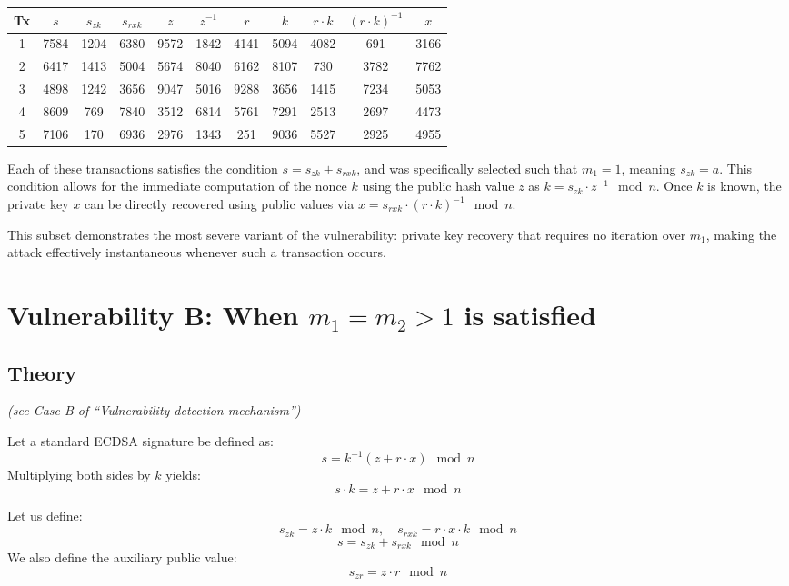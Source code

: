 \documentclass[11pt]{article}
\begin{document}
\begin{center}
\begin{tabular}{|c|c|c|c|c|c|c|c|c|c|c|}
\hline
Tx & $s$ & $s_{zk}$ & $s_{rxk}$ & $z$ & $z^{-1}$ & $r$ & $k$ & $r \cdot k$ & $(r \cdot k)^{-1}$ & $x$ \\
\hline
1 & 7584 & 1204 & 6380 & 9572 & 1842 & 4141 & 5094 & 4082 & 691 & 3166 \\
2 & 6417 & 1413 & 5004 & 5674 & 8040 & 6162 & 8107 & 730 & 3782 & 7762 \\
3 & 4898 & 1242 & 3656 & 9047 & 5016 & 9288 & 3656 & 1415 & 7234 & 5053 \\
4 & 8609 & 769 & 7840 & 3512 & 6814 & 5761 & 7291 & 2513 & 2697 & 4473 \\
5 & 7106 & 170 & 6936 & 2976 & 1343 & 251 & 9036 & 5527 & 2925 & 4955 \\
\hline
\end{tabular}
\end{center}

Each of these transactions satisfies the condition \( s = s_{zk} + s_{rxk} \), and was specifically selected such that \( m_1 = 1 \), meaning \( s_{zk} = a \). This condition allows for the immediate computation of the nonce \( k \) using the public hash value \( z \) as \( k = s_{zk} \cdot z^{-1} \mod n \). Once \( k \) is known, the private key \( x \) can be directly recovered using public values via \( x = s_{rxk} \cdot (r \cdot k)^{-1} \mod n \).

This subset demonstrates the most severe variant of the vulnerability: private key recovery that requires no iteration over \( m_1 \), making the attack effectively instantaneous whenever such a transaction occurs.

\section{Vulnerability B: When \texorpdfstring{$m_1 = m_2 > 1$}{m1 = m2 > 1} is satisfied}
\subsection{Theory}
\textit{(see Case B of “Vulnerability detection mechanism”)}

Let a standard ECDSA signature be defined as:
\[
s = k^{-1}(z + r \cdot x) \mod n
\]
Multiplying both sides by $k$ yields:
\[
s \cdot k = z + r \cdot x \mod n
\]

Let us define:
\[
s_{zk} = z \cdot k \mod n, \quad s_{rxk} = r \cdot x \cdot k \mod n
\]
\[
s = s_{zk} + s_{rxk} \mod n
\]
We also define the auxiliary public value:
\[
s_{zr} = z \cdot r \mod n
\]
\end{document}
